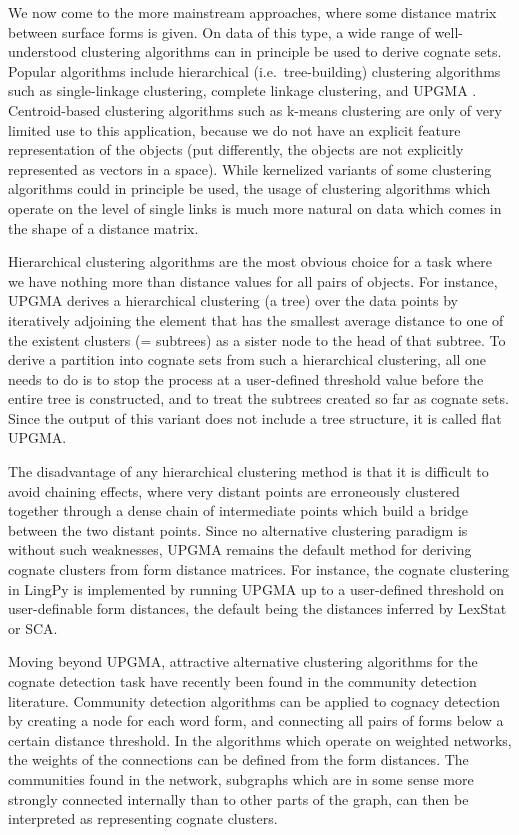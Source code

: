 We now come to the more mainstream approaches, where some distance matrix between surface forms is given. On data of this type, a wide range of well-understood clustering algorithms can in principle be used to derive cognate sets. Popular algorithms include hierarchical (i.e.\ tree-building) clustering algorithms such as single-linkage clustering, complete linkage clustering, and UPGMA \citep{sokal_michener_1958}. Centroid-based clustering algorithms such as k-means clustering \citep{lloyd1982} are only of very limited use to this application, because we do not have an explicit feature representation of the objects (put differently, the objects are not explicitly represented as vectors in a space). While kernelized variants of some clustering algorithms could in principle be used, the usage of clustering algorithms which operate on the level of single links is much more natural on data which comes in the shape of a distance matrix.

Hierarchical clustering algorithms are the most obvious choice for a task where we have nothing more than distance values for all pairs of objects. For instance, UPGMA derives a hierarchical clustering (a tree) over the data points by iteratively adjoining the element that has the smallest average distance to one of the existent clusters (= subtrees) as a sister node to the head of that subtree. To derive a partition into cognate sets from such a hierarchical clustering, all one needs to do is to stop the process at a user-defined threshold value before the entire tree is constructed, and to treat the subtrees created so far as cognate sets. Since the output of this variant does not include a tree structure, it is called flat UPGMA.

The disadvantage of any hierarchical clustering method is that it is difficult to avoid chaining effects, where very distant points are erroneously clustered together through a dense chain of intermediate points which build a bridge between the two distant points. Since no alternative clustering paradigm is without such weaknesses, UPGMA remains the default method for deriving cognate clusters from form distance matrices. For instance, the cognate clustering in LingPy is implemented by running UPGMA up to a user-defined threshold on user-definable form distances, the default being the distances inferred by LexStat or SCA.

Moving beyond UPGMA, attractive alternative clustering algorithms for the cognate detection task have recently been found in the community detection literature. Community detection algorithms can be applied to cognacy detection by creating a node for each word form, and connecting all pairs of forms below a certain distance threshold. In the algorithms which operate on weighted networks, the weights of the connections can be defined from the form distances. The communities found in the network, subgraphs which are in some sense more strongly connected internally than to other parts of the graph, can then be interpreted as representing cognate clusters.

